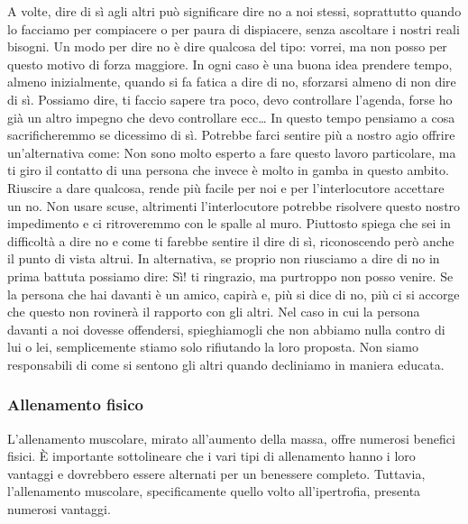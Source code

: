 \documentclass[12pt]{book} %
\begin{document}
A volte, dire di sì agli altri può significare dire no a noi stessi, soprattutto quando lo facciamo per compiacere o per paura di dispiacere, senza ascoltare i nostri reali bisogni.
Un modo per dire no è dire qualcosa del tipo: vorrei, ma non posso per questo motivo di forza maggiore. In
ogni caso è una buona idea prendere tempo, almeno inizialmente, quando si fa fatica a dire di no, sforzarsi almeno di
non dire di sì. Possiamo dire, ti faccio sapere tra poco, devo controllare l'agenda, forse ho già
un altro impegno che devo controllare ecc… In questo tempo pensiamo a cosa sacrificheremmo se dicessimo di sì. Potrebbe
farci sentire più a nostro agio offrire un'alternativa come: Non sono molto esperto a fare questo
lavoro particolare, ma ti giro il contatto di una persona che invece è molto in gamba in questo ambito. Riuscire a dare
qualcosa, rende più facile per noi e per l'interlocutore accettare un no. Non usare scuse,
altrimenti l'interlocutore potrebbe risolvere questo nostro impedimento e ci ritroveremmo con le
spalle al muro. Piuttosto spiega che sei in difficoltà a dire no e come ti farebbe sentire il dire di sì, riconoscendo
però anche il punto di vista altrui. In alternativa, se proprio non riusciamo a dire di no in prima battuta possiamo
dire: Sì! ti ringrazio, ma purtroppo non posso venire. Se la persona che hai davanti è un amico, capirà e, più si dice
di no, più ci si accorge che questo non rovinerà il rapporto con gli altri. Nel caso in cui la persona davanti a noi
dovesse offendersi, spieghiamogli che non abbiamo nulla contro di lui o lei, semplicemente stiamo solo rifiutando la
loro proposta. Non siamo responsabili di come si sentono gli altri quando decliniamo in maniera educata.

\subsubsection{Allenamento fisico}
L'allenamento muscolare, mirato all'aumento della massa, offre numerosi benefici fisici. È importante sottolineare che i vari tipi di allenamento hanno i loro vantaggi e dovrebbero essere alternati per un benessere completo. Tuttavia, l'allenamento muscolare, specificamente quello volto all'ipertrofia, presenta numerosi vantaggi.
\end{document}
